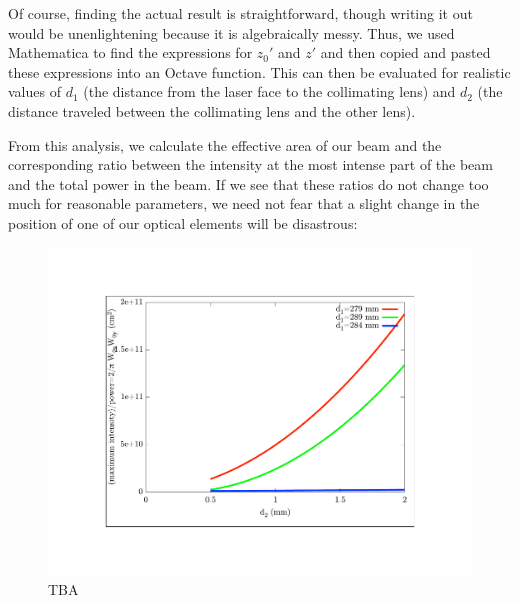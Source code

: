 Of course, finding the actual result is straightforward, though writing it out would be unenlightening because it is algebraically messy. Thus, we used Mathematica to find the expressions for $z_0'$ and $z'$ and then copied and pasted these expressions into an Octave function. This can then be evaluated for realistic values of $d_1$ (the distance from the laser face to the collimating lens) and $d_2$ (the distance traveled between the collimating lens and the other lens). 

From this analysis, we calculate the effective area of our beam and the corresponding ratio between the intensity at the most intense part of the beam and the total power in the beam. If we see that these ratios do not change too much for reasonable parameters, we need not fear that a slight change in the position of one of our optical elements will be disastrous:


\begin{figure}
    \centerline{\includegraphics{waists1}}
    \caption[]{\label{fig:typicaldata}
    TBA}
\end{figure}

